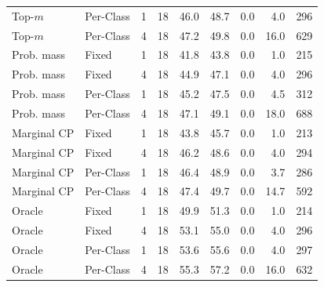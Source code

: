 \begin{tabular}{llrrrrrrr}
Top-$m$ & Per-Class & 1 & 18 & 46.0 & 48.7 & 0.0 & 4.0 & 296 \\
Top-$m$ & Per-Class & 4 & 18 & 47.2 & 49.8 & 0.0 & 16.0 & 629 \\
Prob. mass & Fixed & 1 & 18 & 41.8 & 43.8 & 0.0 & 1.0 & 215 \\
Prob. mass & Fixed & 4 & 18 & 44.9 & 47.1 & 0.0 & 4.0 & 296 \\
Prob. mass & Per-Class & 1 & 18 & 45.2 & 47.5 & 0.0 & 4.5 & 312 \\
Prob. mass & Per-Class & 4 & 18 & 47.1 & 49.1 & 0.0 & 18.0 & 688 \\
Marginal CP & Fixed & 1 & 18 & 43.8 & 45.7 & 0.0 & 1.0 & 213 \\
Marginal CP & Fixed & 4 & 18 & 46.2 & 48.6 & 0.0 & 4.0 & 294 \\
Marginal CP & Per-Class & 1 & 18 & 46.4 & 48.9 & 0.0 & 3.7 & 286 \\
Marginal CP & Per-Class & 4 & 18 & 47.4 & 49.7 & 0.0 & 14.7 & 592 \\
Oracle & Fixed & 1 & 18 & 49.9 & 51.3 & 0.0 & 1.0 & 214 \\
Oracle & Fixed & 4 & 18 & 53.1 & 55.0 & 0.0 & 4.0 & 296 \\
Oracle & Per-Class & 1 & 18 & 53.6 & 55.6 & 0.0 & 4.0 & 297 \\
Oracle & Per-Class & 4 & 18 & 55.3 & 57.2 & 0.0 & 16.0 & 632 \\
\bottomrule
\end{tabular}
